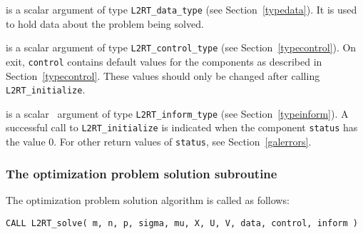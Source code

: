 \documentclass{galahad}
\newcommand{\packagename}{L2\-RT}
\begin{document}
\begin{description}

 is a scalar \intentinout argument of type
{\tt \packagename\_data\_type}
(see Section~\ref{typedata}). It is used to hold data about the problem being
solved.

 is a scalar \intentout argument of type
{\tt \packagename\_control\_type}
(see Section~\ref{typecontrol}).
On exit, {\tt control} contains default values for the components as
described in Section~\ref{typecontrol}.
These values should only be changed after calling
{\tt \packagename\_initialize}.

 is a scalar \intentout\ argument of type
{\tt \packagename\_inform\_type}
(see Section~\ref{typeinform}). A successful call to
{\tt \packagename\_initialize}
is indicated when the  component {\tt status} has the value 0.
For other return values of {\tt status}, see Section~\ref{galerrors}.

\end{description}


\subsubsection{The optimization problem solution subroutine}
The optimization problem solution algorithm is called as follows:

\hskip0.5in
{\tt CALL \packagename\_solve( m, n, p, sigma, mu, X, U, V, data, control, inform )}
\end{document}
